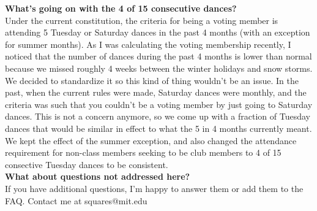 \documentclass{article}
\begin{document}
  \textbf{What's going on with the 4 of 15 consecutive dances?}\\\smallskip
  Under the current constitution, the criteria for being a voting member is attending 5 Tuesday or Saturday dances in the past 4 months (with an exception for summer months). As I was calculating the voting membership recently, I noticed that the number of dances during the past 4 months is lower than normal because we missed roughly 4 weeks between the winter holidays and snow storms. We decided to standardize it so this kind of thing wouldn't be an issue. In the past, when the current rules were made, Saturday dances were monthly, and the criteria was such that you couldn't be a voting member by just going to Saturday dances. This is not a concern anymore, so we come up with a fraction of Tuesday dances that would be similar in effect to what the 5 in 4 months currently meant. We kept the effect of the summer exception, and also changed the attendance requirement for non-class members seeking to be club members to 4 of 15 consective Tuesday dances to be consistent. \\\bigskip
  \textbf{What about questions not addressed here?}\\\smallskip
  If you have additional questions, I'm happy to answer them or add them to the FAQ. Contact me at squares@mit.edu 
  
  
\textbf{}
\end{document}
